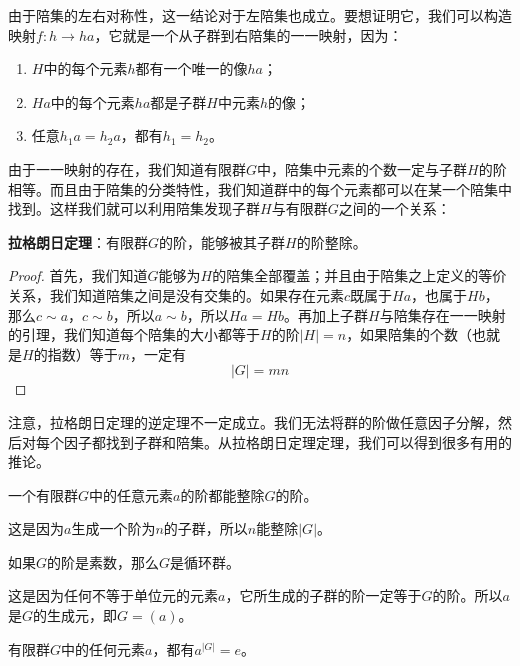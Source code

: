 \documentclass{article}
\begin{document}
由于陪集的左右对称性，这一结论对于左陪集也成立。要想证明它，我们可以构造映射$f: h \to ha$，它就是一个从子群到右陪集的一一映射，因为：

\begin{enumerate}
\item $H$中的每个元素$h$都有一个唯一的像$ha$；
\item $Ha$中的每个元素$ha$都是子群$H$中元素$h$的像；
\item 任意$h_1a = h_2a$，都有$h_1 = h_2$。
\end{enumerate}

由于一一映射的存在，我们知道有限群$G$中，陪集中元素的个数一定与子群$H$的阶相等。而且由于陪集的分类特性，我们知道群中的每个元素都可以在某一个陪集中找到。这样我们就可以利用陪集发现子群$H$与有限群$G$之间的一个关系：

\begin{theorem}
\textbf{拉格朗日定理}：有限群$G$的阶，能够被其子群$H$的阶整除。
\end{theorem}

\begin{proof}
首先，我们知道$G$能够为$H$的陪集全部覆盖；并且由于陪集之上定义的等价关系，我们知道陪集之间是没有交集的。如果存在元素$c$既属于$Ha$，也属于$Hb$，那么$c \sim a$，$c \sim b$，所以$a \sim b$，所以$Ha = Hb$。再加上子群$H$与陪集存在一一映射的引理，我们知道每个陪集的大小都等于$H$的阶$|H|=n$，如果陪集的个数（也就是$H$的指数）等于$m$，一定有
\[
|G| = mn
\]
\end{proof}

注意，拉格朗日定理的逆定理不一定成立。我们无法将群的阶做任意因子分解，然后对每个因子都找到子群和陪集。从拉格朗日定理定理，我们可以得到很多有用的推论。

\begin{corollary}
一个有限群$G$中的任意元素$a$的阶都能整除$G$的阶。
\end{corollary}

这是因为$a$生成一个阶为$n$的子群，所以$n$能整除$|G|$。

\begin{corollary}
如果$G$的阶是素数，那么$G$是循环群。
\end{corollary}

这是因为任何不等于单位元的元素$a$，它所生成的子群的阶一定等于$G$的阶。所以$a$是$G$的生成元，即$G = (a)$。

\begin{corollary}
有限群$G$中的任何元素$a$，都有$a^{|G|} = e$。
\label{corollary:Lagrange-elem-order}
\end{corollary}
\end{document}
